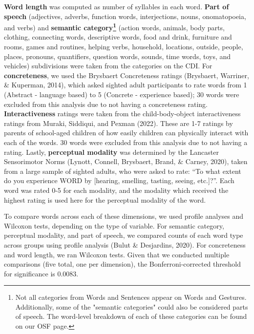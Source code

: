 \documentclass[
  man,floatsintext]{apa6}
\begin{document}
\textbf{Word length} was computed as number of syllables in each word. \textbf{Part of speech} (adjectives, adverbs, function words, interjections, nouns, onomatopoeia, and verbs) and \textbf{semantic category\footnote{Not all categories from Words and Sentences appear on Words and Gestures. Additionally, some of the "semantic categories" could also be considered parts of speech. The word-level breakdown of each of these categories can be found on our OSF page.}} (action words, animals, body parts, clothing, connecting words, descriptive words, food and drink, furniture and rooms, games and routines, helping verbs, household, locations, outside, people, places, pronouns, quantifiers, question words, sounds, time words, toys, and vehicles) subdivisions were taken from the categories on the CDI. For \textbf{concreteness}, we used the Brysbaert Concreteness ratings (Brysbaert, Warriner, \& Kuperman, 2014), which asked sighted adult participants to rate words from 1 (Abstract - language based) to 5 (Concrete - experience based); 30 words were excluded from this analysis due to not having a concreteness rating. \textbf{Interactiveness} ratings were taken from the child-body-object interactiveness ratings from Muraki, Siddiqui, and Pexman (2022). These are 1-7 ratings by parents of school-aged children of how easily children can physically interact with each of the words. 30 words were excluded from this analysis due to not having a rating. Lastly, \textbf{perceptual modality} was determined by the Lancaster Sensorimotor Norms (Lynott, Connell, Brysbaert, Brand, \& Carney, 2020), taken from a large sample of sighted adults, who were asked to rate: ``To what extent do you experience WORD by {[}hearing, smelling, tasting, seeing, etc.{]}?''. Each word was rated 0-5 for each modality, and the modality which received the highest rating is used here for the perceptual modality of the word.

To compare words across each of these dimensions, we used profile analyses and Wilcoxon tests, depending on the type of variable. For semantic category, perceptual modality, and part of speech, we compared counts of each word type across groups using profile analysis (Bulut \& Desjardins, 2020). For concreteness and word length, we ran Wilcoxon tests. Given that we conducted multiple comparisons (five total, one per dimension), the Bonferroni-corrected threshold for significance is 0.0083.
\end{document}
